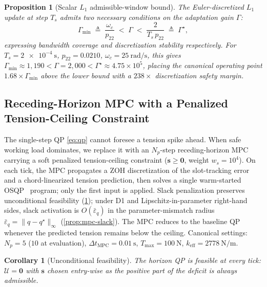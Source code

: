 \documentclass[lettersize,journal]{IEEEtran}
\newtheorem{corollary}{Corollary}%
\newtheorem{proposition}{Proposition}%
\newcommand{\vect}[1]{\boldsymbol{#1}}
\begin{document}
\begin{proposition}[Scalar $L_1$ admissible-window bound]
\label{prop:gamma-star}
The Euler-discretized $L_1$ update at step $T_s$ admits two necessary conditions on the adaptation gain $\Gamma$:
\begin{equation}
  \Gamma_{\min} \;\triangleq\; \frac{\omega_c}{p_{22}}
   \;<\; \Gamma \;<\;
   \frac{2}{T_s\,p_{22}} \;\triangleq\; \Gamma^\star,
   \label{eq:gamma-window}
\end{equation}
expressing bandwidth coverage and discretization stability respectively. For $T_s=\SI{2e-4}{\second}$, $p_{22}=0.0210$, $\omega_c=\SI{25}{\radian\per\second}$, this gives $\Gamma_{\min}\approx 1{,}190 < \Gamma=2{,}000 < \Gamma^\star\approx 4.75\times 10^5$, placing the canonical operating point $1.68\times\Gamma_{\min}$ above the lower bound with a $238\times$ discretization safety margin.
\end{proposition}

\subsection{Receding-Horizon MPC with a Penalized Tension-Ceiling Constraint}
\label{sec:mpc-layer}

The single-step QP \eqref{eq:qp} cannot foresee a tension spike ahead. When safe working load dominates, we replace it with an $N_p$-step receding-horizon MPC carrying a soft penalized tension-ceiling constraint ($\vect s\ge\vect 0$, weight $w_s=10^4$). On each tick, the MPC propagates a ZOH discretization of the slot-tracking error and a chord-linearized tension prediction, then solves a single warm-started OSQP~\cite{stellato2020osqp} program; only the first input is applied. Slack penalization preserves unconditional feasibility (\cref{cor:mpc-recfeas}); under D1 and Lipschitz-in-parameter right-hand sides, slack activation is $O(\bar\varepsilon_q)$ in the parameter-mismatch radius $\bar\varepsilon_q=\|q-q^\star\|_\infty$ (\cref{prop:mpc-slack}). The MPC reduces to the baseline QP whenever the predicted tension remains below the ceiling. Canonical settings: $N_p=5$ ($10$ at evaluation), $\Delta t_{\mathrm{MPC}}=\SI{0.01}{\second}$, $T_{\max}=\SI{100}{\newton}$, $k_{\mathrm{eff}}=\SI{2778}{\newton\per\metre}$.

\begin{corollary}[Unconditional feasibility]
\label{cor:mpc-recfeas}
The horizon QP is feasible at every tick: $\mathcal{U}=\vect 0$ with $\vect s$ chosen entry-wise as the positive part of the deficit is always admissible.
\end{corollary}
\end{document}
